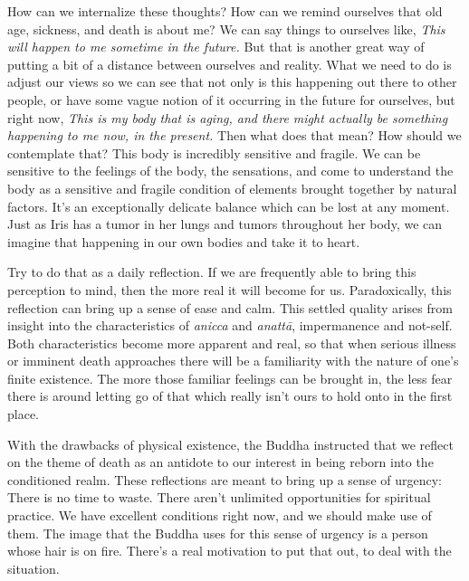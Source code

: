 How can we internalize these thoughts? How can we remind ourselves that 
old age, sickness, and death is about me? We can say things to 
ourselves like, \emph{This will happen to me sometime in the future.} 
But that is another great way of putting a bit of a distance between 
ourselves and reality. What we need to do is adjust our views so we can 
see that not only is this happening out there to other people, or have 
some vague notion of it occurring in the future for ourselves, but 
right now, \emph{This is my body that is aging, and there might 
actually be something happening to me now, in the present.} Then what 
does that mean? How should we contemplate that? This body is incredibly 
sensitive and fragile. We can be sensitive to the feelings of the body, 
the sensations, and come to understand the body as a sensitive and 
fragile condition of elements brought together by natural factors. It's 
an exceptionally delicate balance which can be lost at any moment. Just 
as Iris has a tumor in her lungs and tumors throughout her body, we can 
imagine that happening in our own bodies and take it to heart.

Try to do that as a daily reflection. If we are frequently able to 
bring this perception to mind, then the more real it will become for 
us. Paradoxically, this reflection can bring up a sense of ease and 
calm. This settled quality arises from insight into the characteristics 
of \emph{anicca} and \emph{anattā}, impermanence and not-self. Both 
characteristics become more apparent and real, so that when serious 
illness or imminent death approaches there will be a familiarity with 
the nature of one's finite existence. The more those familiar feelings 
can be brought in, the less fear there is around letting go of that 
which really isn't ours to hold onto in the first place.


With the drawbacks of physical existence, the Buddha instructed that we 
reflect on the theme of death as an antidote to our interest in being 
reborn into the conditioned realm. These reflections are meant to bring 
up a sense of urgency: There is no time to waste. There aren't 
unlimited opportunities for spiritual practice. We have excellent 
conditions right now, and we should make use of them. The image that 
the Buddha uses for this sense of urgency is a person whose hair is on 
fire. There's a real motivation to put that out, to deal with the 
situation.


